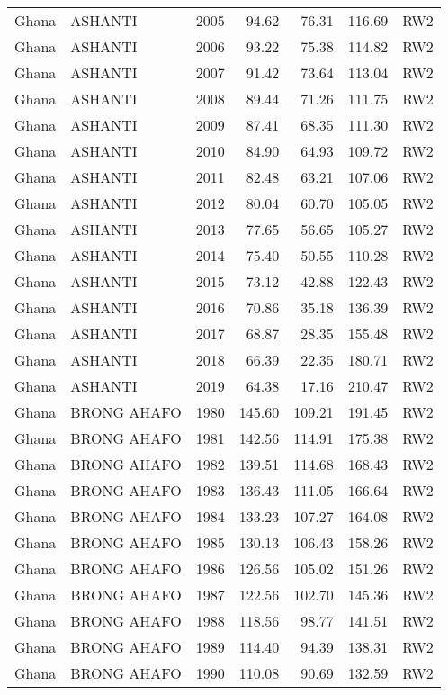 \begin{longtable}{lllrrrl}
  Ghana & ASHANTI & 2005 & 94.62 & 76.31 & 116.69 & RW2 \\ 
  Ghana & ASHANTI & 2006 & 93.22 & 75.38 & 114.82 & RW2 \\ 
  Ghana & ASHANTI & 2007 & 91.42 & 73.64 & 113.04 & RW2 \\ 
  Ghana & ASHANTI & 2008 & 89.44 & 71.26 & 111.75 & RW2 \\ 
  Ghana & ASHANTI & 2009 & 87.41 & 68.35 & 111.30 & RW2 \\ 
  Ghana & ASHANTI & 2010 & 84.90 & 64.93 & 109.72 & RW2 \\ 
  Ghana & ASHANTI & 2011 & 82.48 & 63.21 & 107.06 & RW2 \\ 
  Ghana & ASHANTI & 2012 & 80.04 & 60.70 & 105.05 & RW2 \\ 
  Ghana & ASHANTI & 2013 & 77.65 & 56.65 & 105.27 & RW2 \\ 
  Ghana & ASHANTI & 2014 & 75.40 & 50.55 & 110.28 & RW2 \\ 
  Ghana & ASHANTI & 2015 & 73.12 & 42.88 & 122.43 & RW2 \\ 
  Ghana & ASHANTI & 2016 & 70.86 & 35.18 & 136.39 & RW2 \\ 
  Ghana & ASHANTI & 2017 & 68.87 & 28.35 & 155.48 & RW2 \\ 
  Ghana & ASHANTI & 2018 & 66.39 & 22.35 & 180.71 & RW2 \\ 
  Ghana & ASHANTI & 2019 & 64.38 & 17.16 & 210.47 & RW2 \\ 
  Ghana & BRONG AHAFO & 1980 & 145.60 & 109.21 & 191.45 & RW2 \\ 
  Ghana & BRONG AHAFO & 1981 & 142.56 & 114.91 & 175.38 & RW2 \\ 
  Ghana & BRONG AHAFO & 1982 & 139.51 & 114.68 & 168.43 & RW2 \\ 
  Ghana & BRONG AHAFO & 1983 & 136.43 & 111.05 & 166.64 & RW2 \\ 
  Ghana & BRONG AHAFO & 1984 & 133.23 & 107.27 & 164.08 & RW2 \\ 
  Ghana & BRONG AHAFO & 1985 & 130.13 & 106.43 & 158.26 & RW2 \\ 
  Ghana & BRONG AHAFO & 1986 & 126.56 & 105.02 & 151.26 & RW2 \\ 
  Ghana & BRONG AHAFO & 1987 & 122.56 & 102.70 & 145.36 & RW2 \\ 
  Ghana & BRONG AHAFO & 1988 & 118.56 & 98.77 & 141.51 & RW2 \\ 
  Ghana & BRONG AHAFO & 1989 & 114.40 & 94.39 & 138.31 & RW2 \\ 
  Ghana & BRONG AHAFO & 1990 & 110.08 & 90.69 & 132.59 & RW2 \\ 

\end{longtable}
